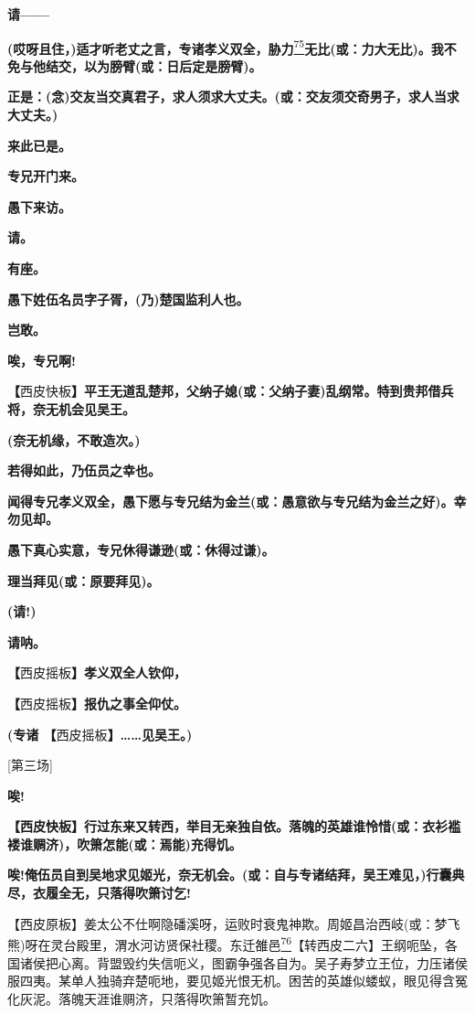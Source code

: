 \textbf{请------}

\textbf{(哎呀且住，)适才听老丈之言，专诸孝义双全，胁力}\protect\hyperlink{fn75}{\textsuperscript{75}}\textbf{无比(或：力大无比)。我不免与他结交，以为膀臂(或：日后定是膀臂)。}

\textbf{正是：(念)交友当交真君子，求人须求大丈夫。(或：交友须交奇男子，求人当求大丈夫。)}

\textbf{来此已是。}

\textbf{专兄开门来。}

\textbf{愚下来访。}

\textbf{请。}

\textbf{有座。}

\textbf{愚下姓伍名员字子胥，(乃)楚国监利人也。}

\textbf{岂敢。}

\textbf{唉，专兄啊!}

\textbf{【}西皮快板\textbf{】平王无道乱楚邦，父纳子媳(或：父纳子妻)乱纲常。特到贵邦借兵将，奈无机会见吴王。}

\textbf{(奈无机缘，不敢造次。)}

\textbf{若得如此，乃伍员之幸也。}

\textbf{闻得专兄孝义双全，愚下愿与专兄结为金兰(或：愚意欲与专兄结为金兰之好)。幸勿见却。}

\textbf{愚下真心实意，专兄休得谦逊(或：休得过谦)。}

\textbf{理当拜见(或：原要拜见)。}

\textbf{(请!)}

\textbf{请呐。}

\textbf{【}西皮摇板\textbf{】孝义双全人钦仰，}

\textbf{【}西皮摇板\textbf{】报仇之事全仰仗。}

\textbf{(专诸 【}西皮摇板\textbf{】\ldots{}\ldots{}见吴王。)}

{[}第三场{]}

\textbf{唉!}

\textbf{【西皮快板】行过东来又转西，举目无亲独自依。落魄的英雄谁怜惜(或：衣衫褴褛谁赒济)，吹箫怎能(或：焉能)充得饥。}

\textbf{唉!俺伍员自到吴地求见姬光，奈无机会。(或：自与专诸结拜，吴王难见，)行囊典尽，衣履全无，只落得吹箫讨乞!}

【西皮原板】姜太公不仕啊隐磻溪呀，运败时衰鬼神欺。周姬昌治西岐(或：梦飞熊)呀在灵台殿里，渭水河访贤保社稷。东迁雒邑\protect\hyperlink{fn76}{\textsuperscript{76}}【转西皮二六】王纲呃坠，各国诸侯把心离。背盟毁约失信呃义，图霸争强各自为。吴子寿梦立王位，力压诸侯服四夷。某单人独骑弃楚呃地，要见姬光恨无机。困苦的英雄似蝼蚁，眼见得含冤化灰泥。落魄天涯谁赒济，只落得吹箫暂充饥。

